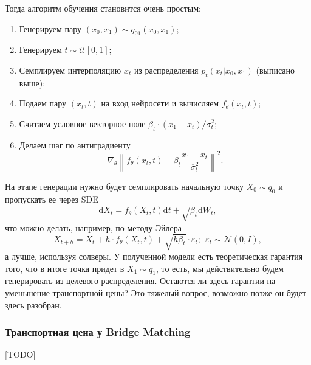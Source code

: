 \documentclass[12pt]{article}
\theoremstyle{definition}
\begin{document}
Тогда алгоритм обучения становится очень простым:
\begin{enumerate}
    \item Генерируем пару $(x_0, x_1) \sim q_{01}(x_0, x_1)$;
    \item Генерируем $t \sim \mathcal{U}[0, 1]$;
    \item Семплируем интерполяцию $x_t$ из распределения $p_t(x_t | x_0, x_1)$ (выписано выше);
    \item Подаем пару $(x_t, t)$ на вход нейросети и вычисляем $f_\theta(x_t, t)$;
    \item Считаем условное векторное поле $\beta_t \cdot (x_1 - x_t) / \overline{\sigma}^2_t$;
    \item Делаем шаг по антиградиенту
    \[
        \nabla_\theta \left\| f_\theta(x_t, t) - \beta_t \frac{x_1 - x_t}{\overline{\sigma}^2_t} \right\|^2.
    \]
\end{enumerate}
На этапе генерации нужно будет семплировать начальную точку $X_0 \sim q_{0}$ и пропускать ее через SDE
\[
    \mathrm{d} X_t = f_\theta(X_t, t)\mathrm{d} t + \sqrt{\beta_t}\mathrm{d}W_t,
\]
что можно делать, например, по методу Эйлера
\[
    X_{t + h} = X_t + h \cdot f_\theta(X_t, t) + \sqrt{h \beta_t} \cdot \varepsilon_t; \:\:\varepsilon_t \sim \mathcal{N}(0, I),
\]
а лучше, используя солверы. У полученной модели есть теоретическая гарантия того, что в итоге точка придет в $X_1 \sim q_1$, то есть, мы действительно будем генерировать из целевого распределения. Остаются ли здесь гарантии на уменьшение транспортной цены? Это тяжелый вопрос, возможно позже он будет здесь разобран.
\subsubsection{Транспортная цена у Bridge Matching}
[TODO]
\newpage


\end{document}
